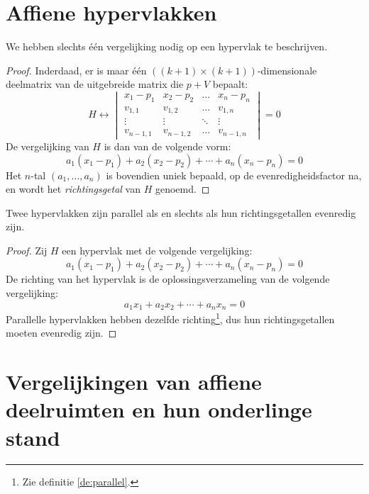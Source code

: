 \documentclass[main.tex]{subfiles}
\begin{document}
\section{Affiene hypervlakken}
\label{sec:affiene-hypervlakken}
\begin{st}
  \label{st:vergelijking-affien-hypervlak}
  We hebben slechts \'e\'en vergelijking nodig op een hypervlak te beschrijven.
  
  \begin{proof}
    Inderdaad, er is maar \'e\'en $((k+1)\times(k+1))$-dimensionale deelmatrix van de uitgebreide matrix die $p+V$ bepaalt:
    \[
    H \leftrightarrow
    \begin{vmatrix}
    x_{1}-p_{1}   & x_{2}-p_{2}  & \hdots & x_{n}-p_{n}\\
    v_{1,1}       & v_{1,2}      & \hdots & v_{1,n}\\
    \vdots        & \vdots       & \ddots & \vdots\\
    v_{n-1,1}     & v_{n-1,2}    & \hdots & v_{n-1,n} 
    \end{vmatrix}
    = 0
    \]
    De vergelijking van $H$ is dan van de volgende vorm:
    \[
    a_{1}(x_{1}-p_{1}) + a_{2}(x_{2}-p_{2}) + \dotsb + a_{n}(x_{n}-p_{n}) = 0
    \]
    Het $n$-tal $(a_{1},\dotsc,a_{n})$ is bovendien uniek bepaald, op de evenredigheidsfactor na, en wordt het \emph{richtingsgetal} van $H$ genoemd.
  \end{proof}
\end{st}

\begin{st}
  \label{st:parallelle-hypervlakken-gelijke-richtingsgetallen}
  Twee hypervlakken zijn parallel als en slechts als hun richtingsgetallen evenredig zijn.
  \begin{proof}
  Zij $H$ een hypervlak met de volgende vergelijking:
  \[
    a_{1}(x_{1}-p_{1}) + a_{2}(x_{2}-p_{2}) + \dotsb + a_{n}(x_{n}-p_{n}) = 0
  \]
  De richting van het hypervlak is de oplossingsverzameling van de volgende vergelijking:
  \[
    a_{1}x_{1} + a_{2}x_{2} + \dotsb + a_{n}x_{n} = 0
  \]
  Parallelle hypervlakken hebben dezelfde richting\footnote{Zie definitie \ref{de:parallel}.}, dus hun richtingsgetallen moeten evenredig zijn.
  \end{proof}
\end{st}

\section{Vergelijkingen van affiene deelruimten en hun onderlinge stand}
\label{sec:vergelijkingen-van-affiene-deelruimten}
\end{document}
